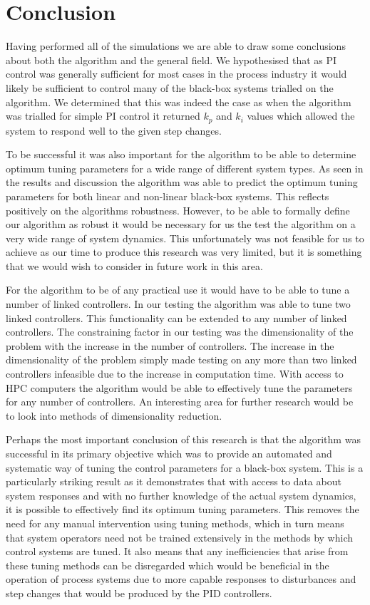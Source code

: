 \documentclass[conference]{IEEEtran}
\theoremstyle{definition}
\begin{document}
\twocolumn
\section{Conclusion}
\noindent Having performed all of the simulations we are able to draw some conclusions about both the algorithm and the general field. We hypothesised that as PI control was generally sufficient for most cases in the process industry it would likely be sufficient to control many of the black-box systems trialled on the algorithm. We determined that this was indeed the case as when the algorithm was trialled for simple PI control it returned $k_p$ and $k_i$ values which allowed the system to respond well to the given step changes. 

\noindent To be successful it was also important for the algorithm to be able to determine optimum tuning parameters for a wide range of different system types. As seen in the results and discussion the algorithm was able to predict the optimum tuning parameters for both linear and non-linear black-box systems. This reflects positively on the algorithms robustness. However, to be able to formally define our algorithm as robust it would be necessary for us the test the algorithm on a very wide range of system dynamics. This unfortunately was not feasible for us to achieve as our time to produce this research was very limited, but it is something that we would wish to consider in future work in this area.

\noindent For the algorithm to be of any practical use it would have to be able to tune a number of linked controllers. In our testing the algorithm was able to tune two linked controllers. This functionality can be extended to any number of linked controllers. The constraining factor in our testing was the dimensionality of the problem with the increase in the number of controllers. The increase in the dimensionality of the problem simply made testing on any more than two linked controllers infeasible due to the increase in computation time. With access to HPC computers the algorithm would be able to effectively tune the parameters for any number of controllers. An interesting area for further research would be to look into methods of dimensionality reduction.

\noindent Perhaps the most important conclusion of this research is that the algorithm was successful in its primary objective which was to provide an automated and systematic way of tuning the control parameters for a black-box system. This is a particularly striking result as it demonstrates that with access to data about system responses and with no further knowledge of the actual system dynamics, it is possible to effectively find its optimum tuning parameters. This removes the need for any manual intervention using tuning methods, which in turn means that system operators need not be trained extensively in the methods by which control systems are tuned. It also means that any inefficiencies that arise from these tuning methods can be disregarded which would be beneficial in the operation of process systems due to more capable responses to disturbances and step changes that would be produced by the PID controllers. 
\end{document}
